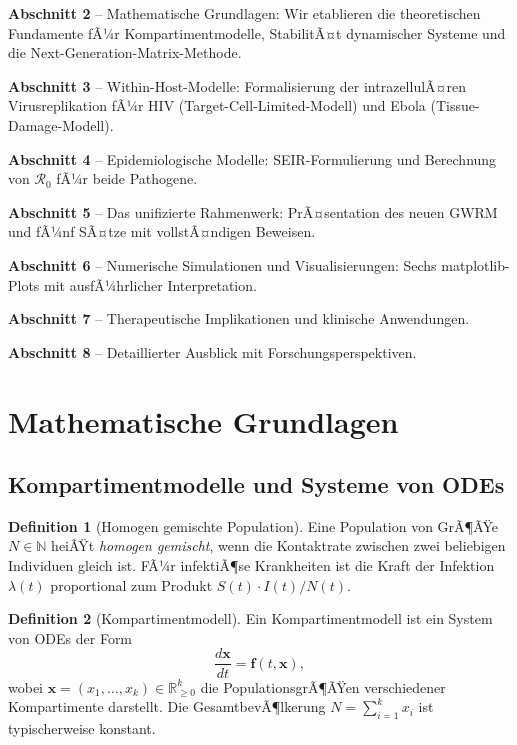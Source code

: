 ﻿\documentclass[a4paper,12pt]{article}
\theoremstyle{definition}
\newtheorem{definition}{Definition}
\begin{document}
\textbf{Abschnitt 2} -- Mathematische Grundlagen: Wir etablieren die theoretischen Fundamente fÃ¼r Kompartimentmodelle, StabilitÃ¤t dynamischer Systeme und die Next-Generation-Matrix-Methode.

\textbf{Abschnitt 3} -- Within-Host-Modelle: Formalisierung der intrazellulÃ¤ren Virusreplikation fÃ¼r HIV (Target-Cell-Limited-Modell) und Ebola (Tissue-Damage-Modell).

\textbf{Abschnitt 4} -- Epidemiologische Modelle: SEIR-Formulierung und Berechnung von $\mathcal{R}_0$ fÃ¼r beide Pathogene.

\textbf{Abschnitt 5} -- Das unifizierte Rahmenwerk: PrÃ¤sentation des neuen GWRM und fÃ¼nf SÃ¤tze mit vollstÃ¤ndigen Beweisen.

\textbf{Abschnitt 6} -- Numerische Simulationen und Visualisierungen: Sechs matplotlib-Plots mit ausfÃ¼hrlicher Interpretation.

\textbf{Abschnitt 7} -- Therapeutische Implikationen und klinische Anwendungen.

\textbf{Abschnitt 8} -- Detaillierter Ausblick mit Forschungsperspektiven.

\section{Mathematische Grundlagen}

\subsection{Kompartimentmodelle und Systeme von ODEs}

\begin{definition}[Homogen gemischte Population]
Eine Population von GrÃ¶ÃŸe $N \in \mathbb{N}$ heiÃŸt \emph{homogen gemischt}, wenn die Kontaktrate zwischen zwei beliebigen Individuen gleich ist. FÃ¼r infektiÃ¶se Krankheiten ist die Kraft der Infektion $\lambda(t)$ proportional zum Produkt $S(t) \cdot I(t)/N(t)$.
\end{definition}

\begin{definition}[Kompartimentmodell]
Ein Kompartimentmodell ist ein System von ODEs der Form
\[
\frac{d\mathbf{x}}{dt} = \mathbf{f}(t, \mathbf{x}),
\]
wobei $\mathbf{x} = (x_1, \ldots, x_k) \in \mathbb{R}_{\geq 0}^k$ die PopulationsgrÃ¶ÃŸen verschiedener Kompartimente darstellt. Die GesamtbevÃ¶lkerung $N = \sum_{i=1}^k x_i$ ist typischerweise konstant.
\end{definition}
\end{document}
